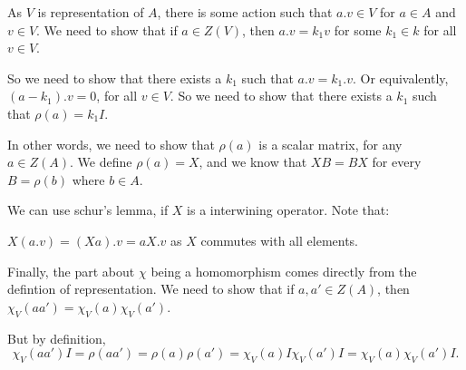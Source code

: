 
As $V$ is representation of $A$, there is some action such that $a.v\in V$ for $a \in A$ and $v\in V$. We need to show that if $a \in Z(V)$, then $a.v = k_1 v$ for some $k_1 \in k$ for all $v\in V$. 

So we need to show that there exists a $k_1$ such that $a.v=k_1.v$. 
Or equivalently, $(a-k_1).v=0$, for all $v \in V$. 
So we need to show that there exists  a $k_1$ such that $\rho(a)=k_1I$.

In other words, we need to show that $\rho(a)$ is a scalar matrix, for any $a \in Z(A)$. 
We define $\rho(a)=X$, and we know that $XB=BX$ for every $B=\rho(b)$ where $b\in A$. 

We can use schur's lemma, if $X$ is a interwining operator. Note that:

$X(a.v)=(Xa).v=aX.v$ as $X$ commutes with all elements.

Finally, the part about $\chi$ being a homomorphism comes directly from the defintion of representation.  We need to show that if $a,a'\in Z(A)$, then $\chi_V(aa') = \chi_V(a)\chi_V(a')$.

But by definition, $$\chi_V(aa')I = \rho(aa') = \rho(a)\rho(a') = \chi_V(a)I \chi_V(a')I = \chi_V(a)\chi_V(a')I. $$
